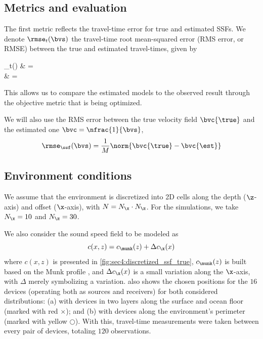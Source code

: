\subsection{Metrics and evaluation}

The first metric reflects the travel-time error for true and estimated SSFs. We denote $\rmse_{t}(\bvs)$ the travel-time root mean-squared error (RMS error, or RMSE) between the true and estimated travel-times, given by
\begin{equations}
	\rmse_{t}(\bvs)
	& =  \\
	& = 
\end{equations}

This allows us to compare the estimated models to the observed result through the objective metric that is being optimized.

We will also use the RMS error between the true velocity field $\bvc{\true}$ and the estimated one $\bvc = \nfrac{1}{\bvs}$,
\begin{equation}
	\rmse_{\ssf}(\bvs) = \frac{1}{M} \norm{\bvc{\true} - \bvc{\est}}
\end{equation}
%


\subsection{Environment conditions}

We assume that the environment is discretized into 2D cells along the depth ($\z$-axis) and offset ($\x$-axis), with $N = N_{\x} \cdot N_{\z}$. For the simulations, we take $N_{\x} = 10$ and $N_{\z} = 30$.

We also consider the sound speed field to be modeled as
\begin{equation}
	c(x,z) = c_{\munk}(z) + \Delta c_{\x}(x)
\end{equation}
where $c(x,z)$ is presented in \cref{fig:sec4:discretized_ssf_true}, $c_{\munk}(z)$ is built based on the Munk profile \cite{munk}, and $\Delta c_{\x}(x)$ is a small variation along the $\x$-axis, with $\Delta$ merely symbolizing a variation.  also shows the chosen positions for the $16$ devices (operating both as sources and receivers) for both considered distributions: (a) with devices in two layers along the surface and ocean floor (marked with red $\times$); and (b) with devices along the environment's perimeter (marked with yellow $\bigcirc$). With this, travel-time measurements were taken between every pair of devices, totaling $120$ observations.

